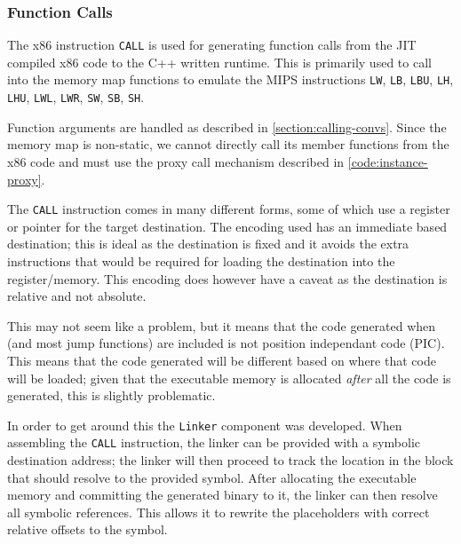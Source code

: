 \subsubsection{Function Calls}

The x86 instruction \texttt{CALL} \cite{x86-call} is used for generating function calls from the JIT compiled x86 code to the C++ written runtime. This is primarily used to call into the memory map functions to emulate the MIPS instructions \texttt{LW}, \texttt{LB}, \texttt{LBU}, \texttt{LH}, \texttt{LHU}, \texttt{LWL}, \texttt{LWR}, \texttt{SW}, \texttt{SB}, \texttt{SH}.

Function arguments are handled as described in \autoref{section:calling-convs}. Since the memory map is non-static, we cannot directly call its member functions from the x86 code and must use the proxy call mechanism described in \autoref{code:instance-proxy}.

The \texttt{CALL} instruction comes in many different forms, some of which use a register or pointer for the target destination. The encoding used has an immediate based destination; this is ideal as the destination is fixed and it avoids the extra instructions that would be required for loading the destination into the register/memory. This encoding does however have a caveat as the destination is relative and not absolute.

This may not seem like a problem, but it means that the code generated when  (and most jump functions) are included is not position independant code (PIC). This means that the code generated will be different based on where that code will be loaded; given that the executable memory is allocated \textit{after} all the code is generated, this is slightly problematic.

In order to get around this the \texttt{Linker} component was developed. When assembling the \texttt{CALL} instruction, the linker can be provided with a symbolic destination address; the linker will then proceed to track the location in the block that should resolve to the provided symbol. After allocating the executable memory and committing the generated binary to it, the linker can then resolve all symbolic references. This allows it to rewrite the placeholders with correct relative offsets to the symbol.